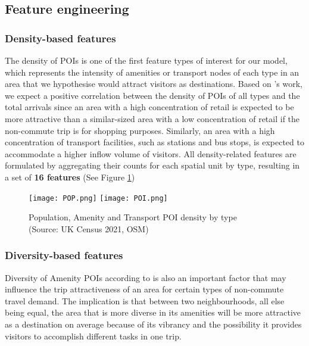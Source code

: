 \subsection{Feature engineering}

\subsubsection*{Density-based features}

The density of POIs is one of the first feature types of interest for our model, which represents the intensity of amenities or transport nodes of each type in an area that we hypothesise would attract visitors as destinations. Based on \citet{cerveroTravelDemand3Ds1997}'s work, we expect a positive correlation between the density of POIs of all types and the total arrivals since an area with a high concentration of retail is expected to be more attractive than a similar-sized area with a low concentration of retail if the non-commute trip is for shopping purposes. Similarly, an area with a high concentration of transport facilities, such as stations and bus stops, is expected to accommodate a higher inflow volume of visitors. All density-related features are formulated by aggregating their counts for each spatial unit by type, resulting in a set of \textbf{16 features} (See Figure \ref{fig:poppoi})

\begin{figure}[!ht]
    \centering
    \texttt{[image: POP.png]}
    \texttt{[image: POI.png]}
    \captionsetup{justification=centering}
    \caption{Population, Amenity and Transport POI density by type\\(Source: UK Census 2021, OSM)}
    \label{fig:poppoi}
\end{figure}

\pagebreak[4] %
\subsubsection*{Diversity-based features}

Diversity of Amenity POIs according to \citet{cerveroTravelDemand3Ds1997} is also an important factor that may influence the trip attractiveness of an area for certain types of non-commute travel demand. The implication is that between two neighbourhoods, all else being equal, the area that is more diverse in its amenities will be more attractive as a destination on average because of its vibrancy and the possibility it provides visitors to accomplish different tasks in one trip.


